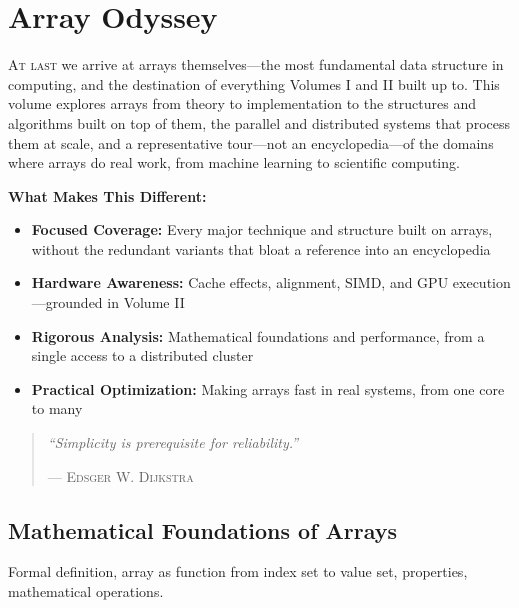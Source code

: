 \part{Array Odyssey}
\label{part:array-odyssey}

\begin{volumeintro}
\lettrine[lines=3]{A}{t last} we arrive at arrays themselves---the most fundamental data structure in computing, and the destination of everything Volumes I and II built up to. This volume explores arrays from theory to implementation to the structures and algorithms built on top of them, the parallel and distributed systems that process them at scale, and a representative tour---not an encyclopedia---of the domains where arrays do real work, from machine learning to scientific computing.

\vspace{1em}
\textbf{What Makes This Different:}
\begin{itemize}[noitemsep]
    \item \textbf{Focused Coverage:} Every major technique and structure built on arrays, without the redundant variants that bloat a reference into an encyclopedia
    \item \textbf{Hardware Awareness:} Cache effects, alignment, SIMD, and GPU execution---grounded in Volume II
    \item \textbf{Rigorous Analysis:} Mathematical foundations and performance, from a single access to a distributed cluster
    \item \textbf{Practical Optimization:} Making arrays fast in real systems, from one core to many
\end{itemize}

\begin{quote}
\textit{``Simplicity is prerequisite for reliability.''}

\hfill--- \textsc{Edsger W. Dijkstra}
\end{quote}
\end{volumeintro}


\chapter{Mathematical Foundations of Arrays}
Formal definition, array as function from index set to value set, properties, mathematical operations.

